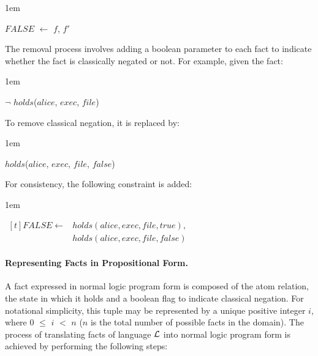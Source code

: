 \documentclass[global,twocolumn,draft]{svjour}
\newenvironment{vquote}
  {\begin{list}{}{\leftmargin 1em}\item[]}
  {\end{list}}
\begin{document}
          \begin{vquote}
            $FALSE$ $\leftarrow$ $f$, $f'$
          \end{vquote}

          The removal process involves adding a boolean parameter to each fact
          to indicate whether the fact is classically negated or not. For
          example, given the fact:

          \begin{vquote}
            $\lnot$ $holds$($alice$, $exec$, $file$)
          \end{vquote}

          To remove classical negation, it is replaced by:

          \begin{vquote}
            $holds$($alice$, $exec$, $file$, $false$)
          \end{vquote}

          For consistency, the following constraint is added:

          \begin{vquote}
            \begin{math}
              \begin{aligned}[t]
                FALSE \leftarrow & holds(alice, exec, file, true), \\
                & holds(alice, exec, file, false)
              \end{aligned}
            \end{math}
          \end{vquote}

        \paragraph{Representing Facts in Propositional Form.}

          A fact expressed in normal logic program form is composed of the
          atom relation, the state in which it holds and a boolean flag to
          indicate classical negation. For notational simplicity, this tuple
          may be represented by a unique positive integer $i$, where $0$ $\leq$
          $i$ $<$ $n$ ($n$ is the total number of possible facts in the
          domain). The process of translating facts of language ${\cal L}$
          into normal logic program form is achieved by performing the
          following steps:
\end{document}

